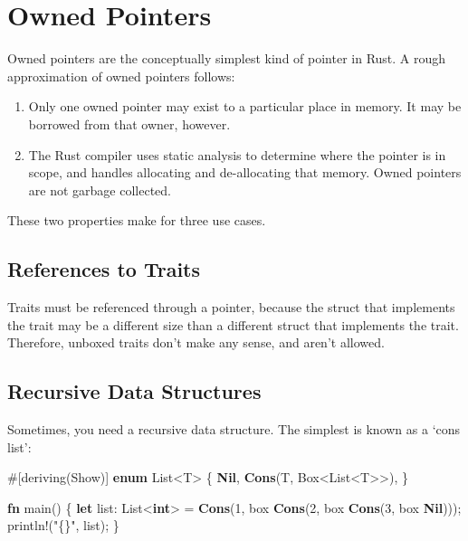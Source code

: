 \documentclass[]{article}
\newenvironment{Shaded}{}{}
\newcommand{\KeywordTok}[1]{\textcolor[rgb]{0.00,0.44,0.13}{\textbf{{#1}}}}
\newcommand{\DecValTok}[1]{\textcolor[rgb]{0.25,0.63,0.44}{{#1}}}
\newcommand{\StringTok}[1]{\textcolor[rgb]{0.25,0.44,0.63}{{#1}}}
\newcommand{\OtherTok}[1]{\textcolor[rgb]{0.00,0.44,0.13}{{#1}}}
\newcommand{\NormalTok}[1]{{#1}}
\begin{document}
\section{Owned Pointers}\label{owned-pointers}

Owned pointers are the conceptually simplest kind of pointer in Rust. A
rough approximation of owned pointers follows:

\begin{enumerate}
\def\labelenumi{\arabic{enumi}.}
\item
  Only one owned pointer may exist to a particular place in memory. It
  may be borrowed from that owner, however.
\item
  The Rust compiler uses static analysis to determine where the pointer
  is in scope, and handles allocating and de-allocating that memory.
  Owned pointers are not garbage collected.
\end{enumerate}

These two properties make for three use cases.

\subsection{References to Traits}\label{references-to-traits}

Traits must be referenced through a pointer, because the struct that
implements the trait may be a different size than a different struct
that implements the trait. Therefore, unboxed traits don't make any
sense, and aren't allowed.

\subsection{Recursive Data Structures}\label{recursive-data-structures}

Sometimes, you need a recursive data structure. The simplest is known as
a `cons list':

\begin{Shaded}
\begin{Highlighting}[]
\OtherTok{#[}\NormalTok{deriving}\OtherTok{(}\NormalTok{Show}\OtherTok{)]}
\KeywordTok{enum} \NormalTok{List<T> \{}
    \KeywordTok{Nil}\NormalTok{,}
    \KeywordTok{Cons}\NormalTok{(T, Box<List<T>>),}
\NormalTok{\}}

\KeywordTok{fn} \NormalTok{main() \{}
    \KeywordTok{let} \NormalTok{list: List<}\KeywordTok{int}\NormalTok{> = }\KeywordTok{Cons}\NormalTok{(}\DecValTok{1}\NormalTok{, box }\KeywordTok{Cons}\NormalTok{(}\DecValTok{2}\NormalTok{, box }\KeywordTok{Cons}\NormalTok{(}\DecValTok{3}\NormalTok{, box }\KeywordTok{Nil}\NormalTok{)));}
    \OtherTok{println!}\NormalTok{(}\StringTok{"\{\}"}\NormalTok{, list);}
\NormalTok{\}}
\end{Highlighting}
\end{Shaded}
\end{document}
